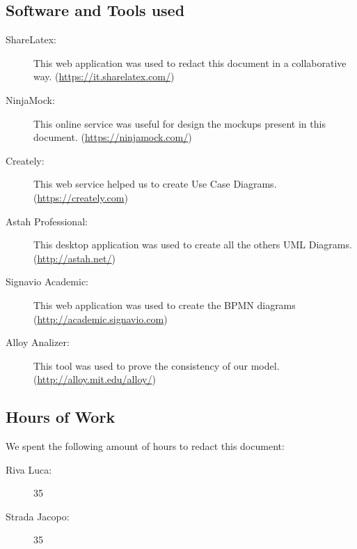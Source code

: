 \documentclass[a4paper]{article}
\begin{document}
\subsection{Software and Tools used}

\begin{description}
\item[ShareLatex:] This web application was used to redact this document in a collaborative way. 
\newline (\url{https://it.sharelatex.com/})
\item[NinjaMock:] This online service was useful for design the mockups present in this document.
\newline (\url{https://ninjamock.com/})
\item[Creately:] This web service helped us to create Use Case Diagrams.
\newline (\url{https://creately.com})
\item[Astah Professional:] This desktop application was used to create all the others UML Diagrams.
\newline (\url{http://astah.net/})
\item[Signavio Academic:] This web application was used to create the BPMN diagrams
\newline (\url{http://academic.signavio.com})
\item[Alloy Analizer:] This tool was used to prove the consistency of our model.
\newline (\url{http://alloy.mit.edu/alloy/})
\end{description}

\subsection{Hours of Work}
We spent the following amount of hours to redact this document:
\begin{description}
\item[Riva Luca:] 35
\item[Strada Jacopo:] 35
\end{description}
\end{document}
